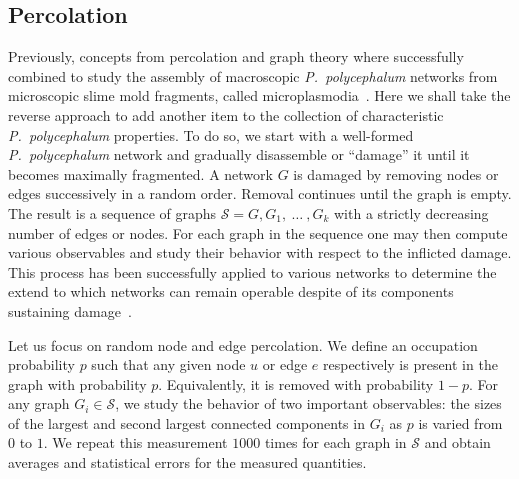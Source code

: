 	\subsection{Percolation}

		Previously, concepts from percolation and graph theory where successfully combined to study the assembly of macroscopic \emph{P.~polycephalum} networks from microscopic slime mold fragments, called microplasmodia~\cite{fessel2012physarum,fessel2014analytical,fessel2015structuring}. Here we shall take the reverse approach to add another item to the collection of characteristic \emph{P.~polycephalum} properties. To do so, we start with a well-formed \emph{P.~polycephalum} network and gradually disassemble or ``damage'' it until it becomes maximally fragmented. A network $G$ is damaged by removing nodes or edges successively in a random order. Removal continues until the graph is empty. The result is a sequence of graphs $\mathcal{S} = {G,G_1, \ \dots \ , G_k}$ with a strictly decreasing number of edges or nodes. For each graph in the sequence one may then compute various observables and study their behavior with respect to the inflicted damage. This process has been successfully applied to various networks to determine the extend to which networks can remain operable despite of its components sustaining damage~\cite{callaway2000network,carlson2002complexity}. 

		Let us focus on random node and edge percolation. We define an occupation probability $p$ such that any given node $u$ or edge $e$ respectively is present in the graph with probability $p$. Equivalently, it is removed with probability $1-p$. For any graph $G_i \in \mathcal{S} $, we study the behavior of two important observables: the sizes of the largest and second largest connected components in $G_i$ as $p$ is varied from $0$ to $1$. We repeat this measurement $1000$ times for each graph in $\mathcal{S}$ and obtain averages and statistical errors for the measured quantities. 

